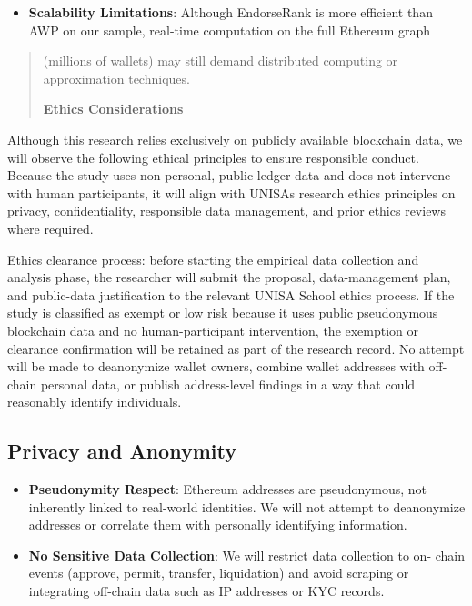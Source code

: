 \documentclass[
]{article}
\begin{document}
\begin{itemize}
\item
  \textbf{Scalability Limitations}: Although EndorseRank is more efficient than AWP on our sample, real-time computation on the full Ethereum graph
\end{itemize}

\begin{quote}
(millions of wallets) may still demand distributed computing or approximation techniques.

\textbf{Ethics Considerations}
\end{quote}

Although this research relies exclusively on publicly available blockchain data, we will observe the following ethical principles to ensure responsible conduct. Because the study uses non-personal, public ledger data and does not intervene with human participants, it will align with UNISA\textquotesingle s research ethics principles on privacy, confidentiality, responsible data management, and prior ethics reviews where required.

Ethics clearance process: before starting the empirical data collection and analysis phase, the researcher will submit the proposal, data-management plan, and public-data justification to the relevant UNISA School ethics process. If the study is classified as exempt or low risk because it uses public pseudonymous blockchain data and no human-participant intervention, the exemption or clearance confirmation will be retained as part of the research record. No attempt will be made to deanonymize wallet owners, combine wallet addresses with off-chain personal data, or publish address-level findings in a way that could reasonably identify individuals.

\subsection{Privacy and Anonymity}\label{privacy-and-anonymity}

\begin{itemize}
\item
  \textbf{Pseudonymity Respect}: Ethereum addresses are pseudonymous, not inherently linked to real-world identities. We will not attempt to deanonymize addresses or correlate them with personally identifying information.
\item
  \textbf{No Sensitive Data Collection}: We will restrict data collection to on- chain events (approve, permit, transfer, liquidation) and avoid scraping or integrating off-chain data such as IP addresses or KYC records.
\end{itemize}
\end{document}
